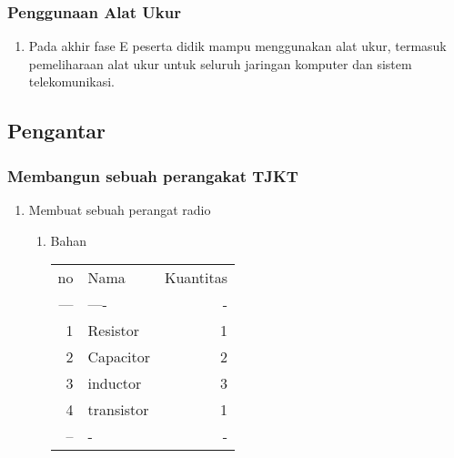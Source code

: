 \documentclass[11pt]{article}
\begin{document}
\subsubsection{Penggunaan Alat Ukur}
\label{sec:org1e4f909}
\begin{enumerate}
\item Pada akhir fase E peserta didik mampu menggunakan alat ukur, termasuk pemeliharaan alat ukur untuk seluruh jaringan komputer dan sistem telekomunikasi.
\label{sec:org6767ae3}
\end{enumerate}

\subsection{Pengantar}
\label{sec:orga298139}
\subsubsection{Membangun sebuah perangakat TJKT}
\label{sec:org273a046}
\begin{enumerate}
\item Membuat sebuah perangat radio
\label{sec:org90e9f22}
\begin{enumerate}
\item Bahan
\label{sec:orgc9296fb}
\begin{center}
\begin{tabular}{rlr}
no & Nama & Kuantitas\\
--- & ---- & -\\
1 & Resistor & 1\\
2 & Capacitor & 2\\
3 & inductor & 3\\
4 & transistor & 1\\
-- & - & -\\
\end{tabular}
\end{center}
\end{enumerate}
\end{enumerate}
\end{document}
